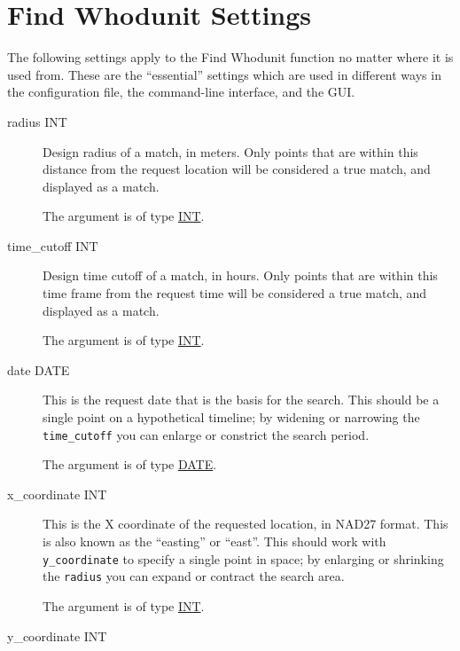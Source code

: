\section{Find Whodunit Settings}
\hypertarget{whodunit-settings}{}

The following settings apply to the Find Whodunit function no matter
where it is used from. These are the ``essential'' settings which are
used in different ways in the configuration file, the command-line
interface, and the GUI.

\begin{description}

\item[radius INT]
\hypertarget{whodunit-radius}{}

Design radius of a match, in meters. Only points that are within this
distance from the request location will be considered a true match,
and displayed as a match.

The argument is of type \hyperlink{argument-type-int}{INT}.

\item[time\_cutoff INT]
\hypertarget{whodunit-time-cutoff}{}

Design time cutoff of a match, in hours. Only points that are within
this time frame from the request time will be considered a true
match, and displayed as a match.

The argument is of type \hyperlink{argument-type-int}{INT}.

\item[date DATE]
\hypertarget{whodunit-date}{}

This is the request date that is the basis for the search. This should
be a single point on a hypothetical timeline; by widening or narrowing
the \verb=time_cutoff= you can enlarge or constrict the search period.

The argument is of type \hyperlink{argument-type-date}{DATE}.

\item[x\_coordinate INT]
\hypertarget{whodunit-x-coordinate}{}

This is the X coordinate of the requested location, in NAD27 format.
This is also known as the ``easting'' or ``east''. This should work
with \verb=y_coordinate= to specify a single point in space; by
enlarging or shrinking the \verb=radius= you can expand or contract
the search area.

The argument is of type \hyperlink{argument-type-int}{INT}.

\item[y\_coordinate INT]
\hypertarget{whodunit-y-coordinate}{}


\end{description}
